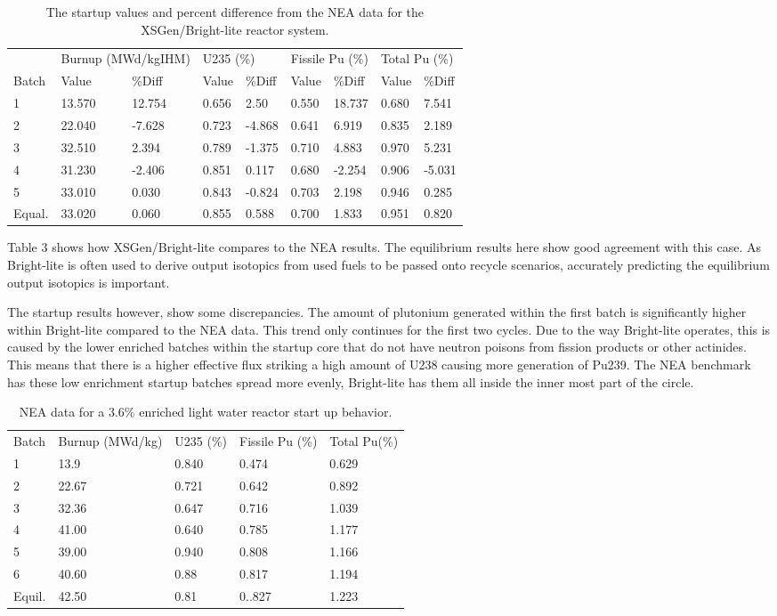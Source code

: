 \documentclass{article}
\begin{document}
\begin{table}[]
\centering
\caption{The startup values and percent difference from the NEA data for the XSGen/Bright-lite reactor system.}
\label{Table 3}
\begin{tabular}{lllllllll}
 & \multicolumn{2}{l}{Burnup (MWd/kgIHM)} & \multicolumn{2}{l}{U235 (\%)} & \multicolumn{2}{l}{Fissile Pu (\%)} & \multicolumn{2}{l}{Total Pu (\%)} \\
Batch & Value & \%Diff & Value & \%Diff & Value & \%Diff & Value & \%Diff \\
1 & 13.570 & 12.754 & 0.656 & 2.50 & 0.550 & 18.737 & 0.680 & 7.541 \\
2 & 22.040 & -7.628 & 0.723 & -4.868 & 0.641 & 6.919 & 0.835 & 2.189 \\
3 & 32.510 & 2.394 & 0.789 & -1.375 & 0.710 & 4.883 & 0.970 & 5.231 \\
4 & 31.230 & -2.406 & 0.851 & 0.117 & 0.680 & -2.254 & 0.906 & -5.031 \\
5 & 33.010 & 0.030 & 0.843 & -0.824 & 0.703 & 2.198 & 0.946 & 0.285 \\
Equal. & 33.020 & 0.060 & 0.855 & 0.588 & 0.700 & 1.833 & 0.951 & 0.820
\end{tabular}
\end{table}

Table 3 shows how XSGen/Bright-lite compares to the NEA results. The equilibrium results here show good agreement with this case. As Bright-lite is often used to derive output isotopics from used fuels to be passed onto recycle scenarios, accurately predicting the equilibrium output isotopics is important. 

The startup results however, show some discrepancies. The amount of plutonium generated within the first batch is significantly higher within Bright-lite compared to the NEA data. This trend only continues for the first two cycles. Due to the way Bright-lite operates, this is caused by the lower enriched batches within the startup core that do not have neutron poisons from fission products or other actinides. This means that there is a higher effective flux striking a high amount of U238 causing more generation of Pu239. The NEA benchmark has these low enrichment startup batches spread more evenly, Bright-lite has them all inside the inner most part of the circle. 

\begin{table}[]
\centering
\caption{NEA data for a 3.6\% enriched light water reactor start up behavior.}
\label{Table 4}
\begin{tabular}{lllll}
Batch & Burnup (MWd/kg) & U235 (\%) & Fissile Pu (\%) & Total Pu(\%) \\
1 & 13.9 & 0.840 & 0.474 & 0.629 \\
2 & 22.67 & 0.721 & 0.642 & 0.892 \\
3 & 32.36 & 0.647 & 0.716 & 1.039 \\
4 & 41.00 & 0.640 & 0.785 & 1.177 \\
5 & 39.00 & 0.940 & 0.808 & 1.166 \\
6 & 40.60 & 0.88 & 0.817 & 1.194 \\
Equil. & 42.50 & 0.81 & 0..827 & 1.223
\end{tabular}
\end{table}
\end{document}
